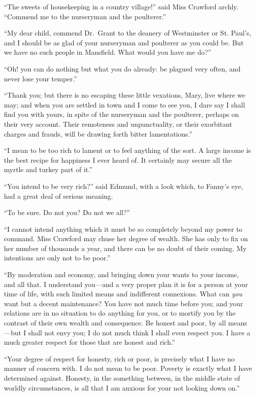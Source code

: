 \documentclass{article}
\begin{document}
``The sweets of housekeeping in a country village!''
said Miss Crawford archly.  ``Commend me to the nurseryman
and the poulterer.''

``My dear child, commend Dr.\ Grant to the deanery
of Westminster or St. Paul's, and I should be as glad
of your nurseryman and poulterer as you could be.  But we
have no such people in Mansfield.  What would you have me do?''

``Oh! you can do nothing but what you do already:
be plagued very often, and never lose your temper.''

``Thank you; but there is no escaping these little vexations,
Mary, live where we may; and when you are settled in town
and I come to see you, I dare say I shall find you
with yours, in spite of the nurseryman and the poulterer,
perhaps on their very account.  Their remoteness
and unpunctuality, or their exorbitant charges and frauds,
will be drawing forth bitter lamentations.''

``I mean to be too rich to lament or to feel anything
of the sort.  A large income is the best recipe for
happiness I ever heard of.  It certainly may secure
all the myrtle and turkey part of it.''

``You intend to be very rich?'' said Edmund, with a look which,
to Fanny's eye, had a great deal of serious meaning.

``To be sure.  Do not you?  Do not we all?''

``I cannot intend anything which it must be so completely
beyond my power to command.  Miss Crawford may chuse her
degree of wealth.  She has only to fix on her number of
thousands a year, and there can be no doubt of their coming.
My intentions are only not to be poor.''

``By moderation and economy, and bringing down your wants
to your income, and all that.  I understand you---and a
very proper plan it is for a person at your time of life,
with such limited means and indifferent connexions.
What can \emph{you} want but a decent maintenance?  You have
not much time before you; and your relations are in no
situation to do anything for you, or to mortify you
by the contrast of their own wealth and consequence.
Be honest and poor, by all means---but I shall not
envy you; I do not much think I shall even respect you.
I have a much greater respect for those that are honest
and rich.''

``Your degree of respect for honesty, rich or poor,
is precisely what I have no manner of concern with.
I do not mean to be poor.  Poverty is exactly what I have
determined against.  Honesty, in the something between,
in the middle state of worldly circumstances, is all that I
am anxious for your not looking down on.''
\end{document}
